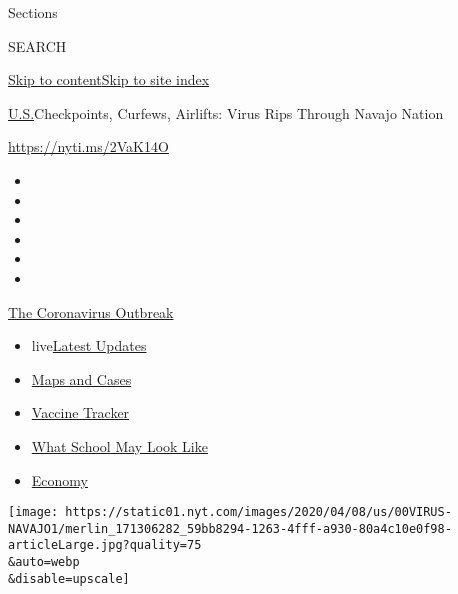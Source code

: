 Sections

SEARCH

\protect\hyperlink{site-content}{Skip to
content}\protect\hyperlink{site-index}{Skip to site index}

\href{/section/us}{U.S.}\textbar{}Checkpoints, Curfews, Airlifts: Virus
Rips Through Navajo Nation

\url{https://nyti.ms/2VaK14O}

\begin{itemize}
\item
\item
\item
\item
\item
\item
\end{itemize}

\href{https://www.nytimes.com/news-event/coronavirus?action=click\&pgtype=Article\&state=default\&region=TOP_BANNER\&context=storylines_menu}{The
Coronavirus Outbreak}

\begin{itemize}
\tightlist
\item
  live\href{https://www.nytimes.com/2020/08/02/world/coronavirus-updates.html?action=click\&pgtype=Article\&state=default\&region=TOP_BANNER\&context=storylines_menu}{Latest
  Updates}
\item
  \href{https://www.nytimes.com/interactive/2020/us/coronavirus-us-cases.html?action=click\&pgtype=Article\&state=default\&region=TOP_BANNER\&context=storylines_menu}{Maps
  and Cases}
\item
  \href{https://www.nytimes.com/interactive/2020/science/coronavirus-vaccine-tracker.html?action=click\&pgtype=Article\&state=default\&region=TOP_BANNER\&context=storylines_menu}{Vaccine
  Tracker}
\item
  \href{https://www.nytimes.com/interactive/2020/07/29/us/schools-reopening-coronavirus.html?action=click\&pgtype=Article\&state=default\&region=TOP_BANNER\&context=storylines_menu}{What
  School May Look Like}
\item
  \href{https://www.nytimes.com/live/2020/07/31/business/stock-market-today-coronavirus?action=click\&pgtype=Article\&state=default\&region=TOP_BANNER\&context=storylines_menu}{Economy}
\end{itemize}

\texttt{[image: https://static01.nyt.com/images/2020/04/08/us/00VIRUS-NAVAJO1/merlin\_171306282\_59bb8294-1263-4fff-a930-80a4c10e0f98-articleLarge.jpg?quality=75\\\&auto=webp\\\&disable=upscale]}

